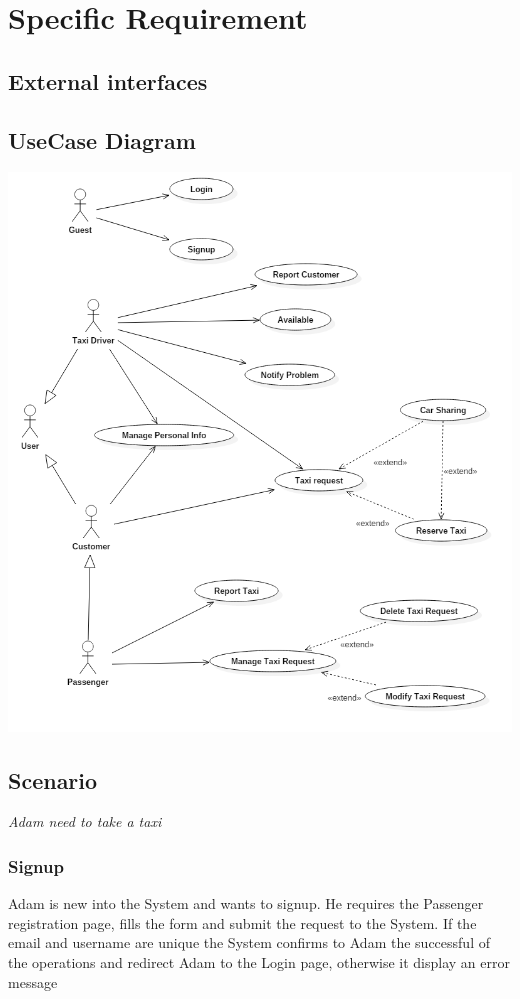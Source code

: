 \documentclass[english]{article}
\begin{document}
\section{Specific Requirement}

\subsection{External interfaces}

\subsection{UseCase Diagram}

\includegraphics[width=\textwidth]{UseCase}

\subsection{Scenario}

\emph{Adam need to take a taxi}

\subsubsection{Signup}
Adam is new into the System and wants to signup. He requires the Passenger registration page, fills the form and submit the request to the System. If the email and username are unique the System confirms to Adam the successful of the operations and redirect Adam to the Login page, otherwise it display an error message
\end{document}
